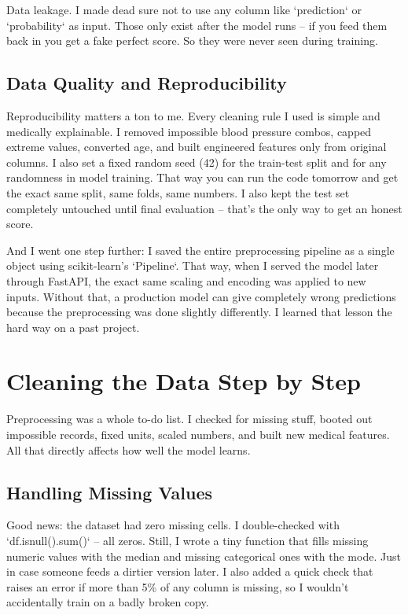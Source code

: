 \documentclass[12pt, a4paper, oneside]{book}
\begin{document}
\begin{keyinsight}
Data leakage. I made dead sure not to use any column like `prediction` or `probability` as input. Those only exist after the model runs – if you feed them back in you get a fake perfect score. So they were never seen during training.
\end{keyinsight}

\subsection{Data Quality and Reproducibility}
Reproducibility matters a ton to me. Every cleaning rule I used is simple and medically explainable. I removed impossible blood pressure combos, capped extreme values, converted age, and built engineered features only from original columns. I also set a fixed random seed (42) for the train-test split and for any randomness in model training. That way you can run the code tomorrow and get the exact same split, same folds, same numbers. I also kept the test set completely untouched until final evaluation – that's the only way to get an honest score.

And I went one step further: I saved the entire preprocessing pipeline as a single object using scikit-learn's `Pipeline`. That way, when I served the model later through FastAPI, the exact same scaling and encoding was applied to new inputs. Without that, a production model can give completely wrong predictions because the preprocessing was done slightly differently. I learned that lesson the hard way on a past project.

\section{Cleaning the Data Step by Step}
Preprocessing was a whole to-do list. I checked for missing stuff, booted out impossible records, fixed units, scaled numbers, and built new medical features. All that directly affects how well the model learns.

\subsection{Handling Missing Values}
Good news: the dataset had zero missing cells. I double-checked with `df.isnull().sum()` – all zeros. Still, I wrote a tiny function that fills missing numeric values with the median and missing categorical ones with the mode. Just in case someone feeds a dirtier version later. I also added a quick check that raises an error if more than 5\% of any column is missing, so I wouldn't accidentally train on a badly broken copy.
\end{document}
